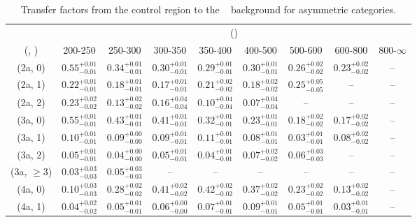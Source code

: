 \begin{table}[h!]
\tiny
\centering
\caption{Transfer factors from the \mj control region to the \zInv~ background for asymmetric categories.\label{tab:tf_mu_zinv_asym}}
\begin{tabular}
{ccccccccc}
	\hline\hline
	& \multicolumn{8}{c}{\scalht (\gev)} \\ 
	 (\njet,  \nb) & 200-250 & 250-300 & 300-350 & 350-400 & 400-500 & 500-600 & 600-800 & 800-$\infty$ \\ [0.8ex] 
\hline
	(2a, 0) & $0.55^{+ 0.01 }_{- 0.01 }$ & $0.34^{+ 0.01 }_{- 0.01 }$ & $0.30^{+ 0.01 }_{- 0.01 }$ & $0.29^{+ 0.01 }_{- 0.01 }$ & $0.30^{+ 0.01 }_{- 0.01 }$ & $0.26^{+ 0.02 }_{- 0.02 }$ & $0.23^{+ 0.02 }_{- 0.02 }$ & -- \\[0.5ex] 
	(2a, 1) & $0.22^{+ 0.01 }_{- 0.01 }$ & $0.18^{+ 0.01 }_{- 0.01 }$ & $0.17^{+ 0.01 }_{- 0.01 }$ & $0.21^{+ 0.02 }_{- 0.02 }$ & $0.18^{+ 0.02 }_{- 0.02 }$ & $0.25^{+ 0.05 }_{- 0.05 }$ & -- & -- \\[0.5ex] 
	(2a, 2) & $0.23^{+ 0.02 }_{- 0.02 }$ & $0.13^{+ 0.02 }_{- 0.02 }$ & $0.16^{+ 0.04 }_{- 0.04 }$ & $0.10^{+ 0.04 }_{- 0.04 }$ & $0.07^{+ 0.04 }_{- 0.04 }$ & -- & -- & -- \\[0.5ex] 
	(3a, 0) & $0.55^{+ 0.01 }_{- 0.01 }$ & $0.43^{+ 0.01 }_{- 0.01 }$ & $0.41^{+ 0.01 }_{- 0.01 }$ & $0.32^{+ 0.01 }_{- 0.01 }$ & $0.23^{+ 0.01 }_{- 0.01 }$ & $0.18^{+ 0.02 }_{- 0.02 }$ & $0.17^{+ 0.02 }_{- 0.02 }$ & -- \\[0.5ex] 
	(3a, 1) & $0.10^{+ 0.01 }_{- 0.01 }$ & $0.09^{+ 0.00 }_{- 0.00 }$ & $0.09^{+ 0.01 }_{- 0.01 }$ & $0.11^{+ 0.01 }_{- 0.01 }$ & $0.08^{+ 0.01 }_{- 0.01 }$ & $0.03^{+ 0.01 }_{- 0.01 }$ & $0.08^{+ 0.02 }_{- 0.02 }$ & -- \\[0.5ex] 
	(3a, 2) & $0.05^{+ 0.01 }_{- 0.01 }$ & $0.04^{+ 0.00 }_{- 0.00 }$ & $0.05^{+ 0.01 }_{- 0.01 }$ & $0.04^{+ 0.01 }_{- 0.01 }$ & $0.07^{+ 0.02 }_{- 0.02 }$ & $0.06^{+ 0.03 }_{- 0.03 }$ & -- & -- \\[0.5ex] 
	(3a, $\ge3$) & $0.03^{+ 0.03 }_{- 0.03 }$ & $0.05^{+ 0.03 }_{- 0.03 }$ & -- & -- & -- & -- & -- & -- \\[0.5ex] 
	(4a, 0) & $0.10^{+ 0.03 }_{- 0.03 }$ & $0.28^{+ 0.02 }_{- 0.02 }$ & $0.41^{+ 0.02 }_{- 0.02 }$ & $0.42^{+ 0.02 }_{- 0.02 }$ & $0.37^{+ 0.02 }_{- 0.02 }$ & $0.23^{+ 0.02 }_{- 0.02 }$ & $0.13^{+ 0.02 }_{- 0.02 }$ & -- \\[0.5ex] 
	(4a, 1) & $0.04^{+ 0.02 }_{- 0.02 }$ & $0.05^{+ 0.01 }_{- 0.01 }$ & $0.06^{+ 0.00 }_{- 0.00 }$ & $0.07^{+ 0.01 }_{- 0.01 }$ & $0.09^{+ 0.01 }_{- 0.01 }$ & $0.05^{+ 0.01 }_{- 0.01 }$ & $0.03^{+ 0.01 }_{- 0.01 }$ & -- \\[0.5ex] 

\end{tabular}
\end{table}
